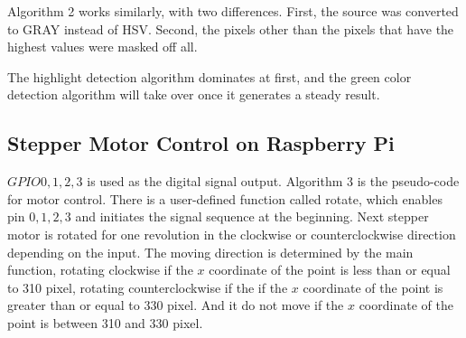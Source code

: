 Algorithm 2 works similarly, with two differences. First, the source was converted to GRAY instead of HSV. Second, the pixels other than the pixels that have the highest values were masked off all. 

The highlight detection algorithm dominates at first, and the green color detection algorithm will take over once it generates a steady result.

\begin{algorithmic} 
\ELSE 
{}
\ENDIF
\ENDFOR
{}
\end{algorithmic}

\begin{algorithmic} 
\ELSE 
{}
\ENDIF
\ENDFOR	
{}
\end{algorithmic}

\subsection{Stepper Motor Control on Raspberry Pi}


$GPIO 0,1,2,3$ is used as the digital signal output. Algorithm 3 is the pseudo-code for motor control. There is a user-defined function called rotate, which enables pin $0,1,2,3$ and initiates the signal sequence at the beginning. Next stepper motor is rotated for one revolution in the clockwise or counterclockwise direction depending on the input. The moving direction is determined by the main function, rotating clockwise if the $x$ coordinate of the point is less than or equal to 310 pixel, rotating counterclockwise if the if the $x$ coordinate of the point is greater than or equal to 330 pixel. And it do not move if the $x$ coordinate of the point is between 310 and 330 pixel. 

